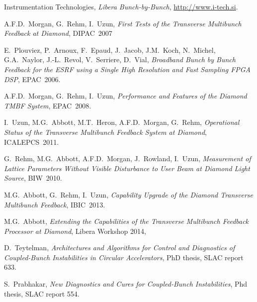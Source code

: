 \documentclass[a4paper]{jacow}
\begin{document}
\begin{thebibliography}{10}

Instrumentation Technologies, \emph{Libera Bunch-by-Bunch},
\url{http://www.i-tech.si}.

A.F.D.~Morgan, G.~Rehm, I.~Uzun, \emph{First Tests of the Transverse Multibunch
Feedback at Diamond}, DIPAC~2007

E.~Plouviez, P.~Arnoux, F.~Epaud, J.~Jacob, J.M.~Koch, N.~Michel, G.A.~Naylor,
J.\mbox{-}L.~Revol, V.~Serriere, D.~Vial, \emph{Broadband Bunch by Bunch
Feedback for the ESRF using a Single High Resolution and Fast Sampling FPGA
DSP}, EPAC~2006.

A.F.D.~Morgan, G.~Rehm, I.~Uzun, \emph{Performance and Features of the Diamond
TMBF System}, EPAC~2008.

I.~Uzun, M.G.~Abbott, M.T.~Heron, A.F.D.~Morgan, G.~Rehm, \emph{Operational
Status of the Transverse Multibunch Feedback System at Diamond}, ICALEPCS~2011.

G.~Rehm, M.G.~Abbott, A.F.D.~Morgan, J.~Rowland, I.~Uzun, \emph{Measurement of
Lattice Parameters Without Visible Disturbance to User Beam at Diamond Light
Source}, BIW~2010.

M.G.~Abbott, G.~Rehm, I.~Uzun, \emph{Capability Upgrade of the Diamond Transverse Multibunch Feedback}, IBIC~2013.

M.G.~Abbott, \emph{Extending the Capabilities of the Transverse Multibunch Feedback
Processor at Diamond}, Libera Workshop 2014, 


D.~Teytelman, \emph{Architectures and Algorithms for Control and Diagnostics of
Coupled-Bunch Instabilities in Circular Accelerators}, PhD thesis, SLAC report 633.

S.~Prabhakar, \emph{New Diagnostics and Cures for Coupled-Bunch Instabilities}, Phd thesis, SLAC report 554.
\end{thebibliography}
\vspace{0mm}
\end{document}
